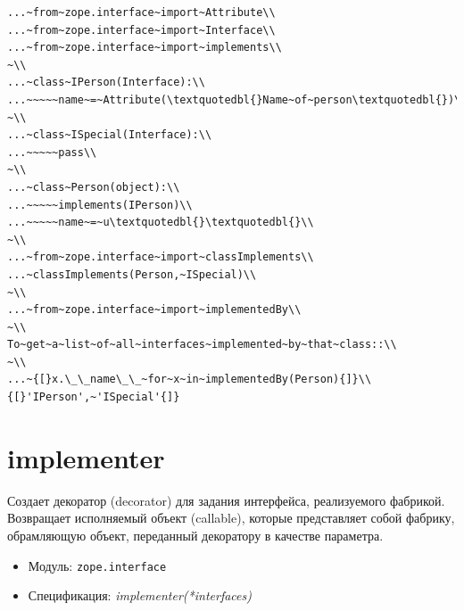 \documentclass[a4paper,openany,twoside,draft]{book}
\providecommand*{\DUroletitlereference}[1]{\textsl{#1}}
\begin{document}
\begin{verbatim}
...~from~zope.interface~import~Attribute\\
...~from~zope.interface~import~Interface\\
...~from~zope.interface~import~implements\\
~\\
...~class~IPerson(Interface):\\
...~~~~~name~=~Attribute(\textquotedbl{}Name~of~person\textquotedbl{})\\
~\\
...~class~ISpecial(Interface):\\
...~~~~~pass\\
~\\
...~class~Person(object):\\
...~~~~~implements(IPerson)\\
...~~~~~name~=~u\textquotedbl{}\textquotedbl{}\\
~\\
...~from~zope.interface~import~classImplements\\
...~classImplements(Person,~ISpecial)\\
~\\
...~from~zope.interface~import~implementedBy\\
~\\
To~get~a~list~of~all~interfaces~implemented~by~that~class::\\
~\\
...~{[}x.\_\_name\_\_~for~x~in~implementedBy(Person){]}\\
{[}'IPerson',~'ISpecial'{]}
\end{verbatim}


\section*{implementer%
  \label{implementer}%
}

Создает декоратор (decorator) для задания интерфейса, реализуемого
фабрикой.  Возвращает исполняемый объект (callable), которые
представляет собой фабрику, обрамляющую объект, переданный декоратору
в качестве параметра.

\begin{itemize}

\item Модуль: \texttt{zope.interface}

\item Спецификация: \DUroletitlereference{implementer(*interfaces)}

\end{itemize}
\end{document}
